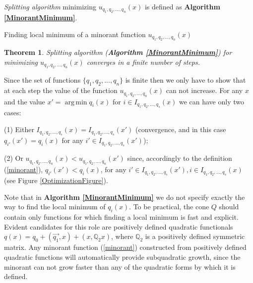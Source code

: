 \documentclass[preprint,12pt,twocolumn]{elsarticle}
\makeatletter
\newtheorem{theorem}{Theorem}[section]
\newenvironment{proof}[1][Proof]{\begin{trivlist}
\item[\hskip \labelsep {\bfseries #1}]}{\end{trivlist}}
\newenvironment{definition}[1][Definition]{\begin{trivlist}
\item[\hskip \labelsep {\bfseries #1}]}{\end{trivlist}}
\DeclareMathOperator*{\argmin}{arg\,min}
\def\BState{\State\hskip-\ALG@thistlm}
\makeatother
\begin{document}
\begin{definition}{\it Splitting algorithm} minimizing $u_{q_{1},q_{2},...,q_{n}}(x)$ is defined as \textbf{Algorithm \ref{MinorantMinimum}}.
\end{definition}

\begin{algorithm}
\caption{Finding local minimum of a minorant function $u_{q_{1},q_{2},...,q_{n}}(x)$}\label{MinorantMinimum}
\end{algorithm}

\begin{theorem}\label{theoremConvergence} Splitting algorithm (\textbf{Algorithm \ref{MinorantMinimum}}) for minimizing $u_{q_{1},q_{2},...,q_{n}}(x)$ converges in a finite number of steps.
\end{theorem}
\begin{proof}
Since the set of functions $\{q_{1},q_{2},...,q_{n}\}$ is finite then we only have to show that at each step the value of the function $u_{q_{1},q_{2},...,q_{n}}(x)$ can not increase. For any $x$ and the value $x' = \argmin q_i(x)$ for $i\in I_{q_1,q_2,...,q_s}(x)$ we can have only two cases:

(1) Either $I_{q_1,q_2,...,q_s}(x)=I_{q_1,q_2,...,q_s}(x')$ (convergence, and in this case $q_{i'}(x')=q_i(x)$ for any $i'\in I_{q_1,q_2,...,q_s}(x')$);

(2) Or $u_{q_{1},q_{2},...,q_{n}}(x)<u_{q_{1},q_{2},...,q_{n}}(x')$ since, accordingly to the definition (\ref{minorant}), $q_{i'}(x')<q_i(x)$, for any $i'\in I_{q_1,q_2,...,q_s}(x'), i\in I_{q_1,q_2,...,q_s}(x)$ (see Figure \ref{OptimizationFigure}).
\end{proof}

Note that in \textbf{Algorithm \ref{MinorantMinimum}} we do not specify exactly the way to find the local minimum of $q_i(x)$. To be practical, the cone $Q$ should contain only functions for which finding a local minimum is fast and explicit. Evident candidates for this role are positively defined quadratic functionals $q(x)=q_{0}+(\vec{q_1},x)+(x,\mathbb{Q}_2x)$, where $\mathbb{Q}_2$ is a positively defined symmetric matrix. Any minorant function (\ref{minorant}) constructed from positively defined quadratic functions will automatically provide subquadratic growth, since the minorant can not grow faster than any of the quadratic forms by which it is defined.
\end{document}
